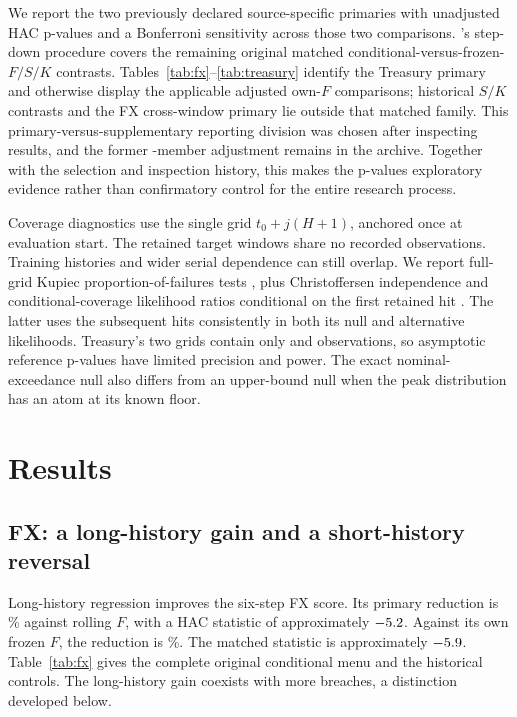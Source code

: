 We report the two previously declared source-specific primaries with unadjusted HAC p-values and a Bonferroni sensitivity across those two comparisons. \citet{holm1979}'s step-down procedure covers the remaining \RemainingMatchedCount{} original matched conditional-versus-frozen-$F/S/K$ contrasts. Tables~\ref{tab:fx}--\ref{tab:treasury} identify the Treasury primary and otherwise display the applicable adjusted own-$F$ comparisons; historical $S/K$ contrasts and the FX cross-window primary lie outside that matched family. This primary-versus-supplementary reporting division was chosen after inspecting results, and the former \ArchivedMatchedCount{}-member adjustment remains in the archive. Together with the selection and inspection history, this makes the p-values exploratory evidence rather than confirmatory control for the entire research process.

Coverage diagnostics use the single grid $t_0+j(H+1)$, anchored once at evaluation start. The retained target windows share no recorded observations. Training histories and wider serial dependence can still overlap. We report full-grid Kupiec proportion-of-failures tests \citep{kupiec1995}, plus Christoffersen independence and conditional-coverage likelihood ratios conditional on the first retained hit \citep{christoffersen1998}. The latter uses the subsequent hits consistently in both its null and alternative likelihoods. Treasury's two grids contain only \TreasuryShortGridCount{} and \TreasuryLongGridCount{} observations, so asymptotic reference p-values have limited precision and power. The exact nominal-exceedance null also differs from an upper-bound null when the peak distribution has an atom at its known floor.

\section{Results}
\subsection{FX: a long-history gain and a short-history reversal}
Long-history regression improves the six-step FX score. Its primary reduction is \FXPrimaryGain{}\% against rolling $F$, with a HAC statistic of approximately $-5.2{}$. Against its own frozen $F$, the reduction is \FXMatchedGain{}\%. The matched statistic is approximately $-5.9{}$. Table~\ref{tab:fx} gives the complete original conditional menu and the historical controls. The long-history gain coexists with more breaches, a distinction developed below.

